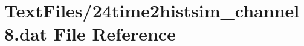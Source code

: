 \hypertarget{24time2histsim__channel8_8dat}{}\section{Text\+Files/24time2histsim\+\_\+channel8.dat File Reference}
\label{24time2histsim__channel8_8dat}
